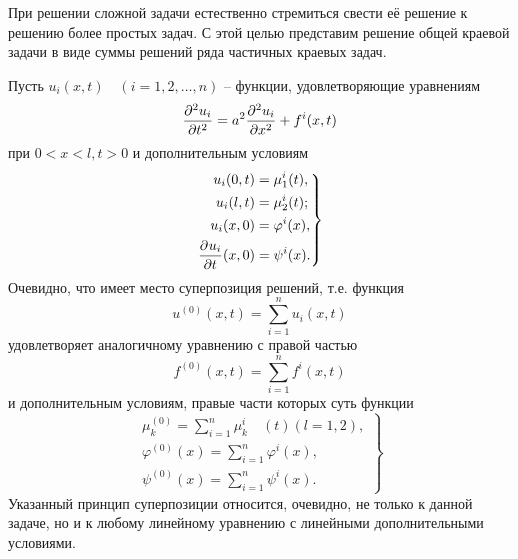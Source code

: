 \setcounter{equation}{0}
При решении сложной задачи естественно стремиться свести её решение к решению более простых задач. С этой целью представим решение общей краевой задачи в виде суммы решений ряда частичных краевых задач.

Пусть $u_i(x, t) \quad (i = 1, 2, \ldots, n)$ -- функции, удовлетворяющие уравнениям
\begin{equation}
	\frac{\partial^{2}u_i}{\partial t^{2}} = a^2 \frac{\partial^{2}u_i}{\partial x^{2}} + f^i(x, t)
	\label{equ:Reduction1}
\end{equation}
при $0 < x < l, t > 0$ и дополнительным условиям
\begin{equation}
	\left.
	\begin{aligned}
		u_i(0, t) &= \mu_1^i(t),\\
		u_i(l, t) &= \mu_2^i(t);\\
		u_i (x, 0) & = \varphi^i(x),\\
		\frac{\partial^{}u_i}{\partial t^{}} (x, 0) &=\psi^i (x).
	\end{aligned}	
	\right\}
	\label{equ:Reduction2}
\end{equation}
Очевидно, что имеет место суперпозиция решений, т.е. функция
\begin{equation}
	u^{(0)}(x, t) = \sum\limits_{i = 1}^n u_i (x, t)
	\label{equ:Reduction3}
\end{equation}
удовлетворяет аналогичному уравнению с правой частью
\begin{equation}
	f^{(0)} (x, t) = \sum\limits_{i = 1}^n f^i (x, t)
	\label{equ:Reduction4}
\end{equation}
и дополнительным условиям, правые части которых суть функции
\begin{equation}
	\left.
	\begin{aligned}
		\mu_k^{(0)} = \sum\limits_{i = 1}^n \mu_k^i \quad (t) (l = 1, 2),\\
		\varphi^{(0)} (x) = \sum\limits_{i = 1}^n \varphi^i (x),\\
		\psi^{(0)} (x) = \sum\limits_{i = 1}^n \psi^i (x).
	\end{aligned}
	\right\}
	\label{equ:Reduction5}
\end{equation}
Указанный принцип суперпозиции относится, очевидно, не только к данной задаче, но и к любому линейному уравнению с линейными дополнительными условиями. \\

